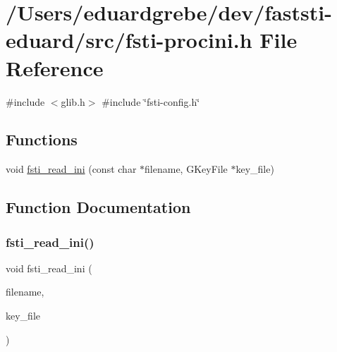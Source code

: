\hypertarget{fsti-procini_8h}{}\section{/\+Users/eduardgrebe/dev/faststi-\/eduard/src/fsti-\/procini.h File Reference}
\label{fsti-procini_8h}
{\ttfamily \#include $<$glib.\+h$>$}\newline
{\ttfamily \#include \char`\"{}fsti-\/config.\+h\char`\"{}}\newline
\subsection*{Functions}
\begin{DoxyCompactItemize}
\item 
void \mbox{\hyperlink{fsti-procini_8h_a438ad09d742e78ab09216d2b532f02bd}{fsti\+\_\+read\+\_\+ini}} (const char $\ast$filename, G\+Key\+File $\ast$key\+\_\+file)
\end{DoxyCompactItemize}


\subsection{Function Documentation}
\mbox{\label{fsti-procini_8h_a438ad09d742e78ab09216d2b532f02bd}} 
\subsubsection{\texorpdfstring{fsti\+\_\+read\+\_\+ini()}{fsti\_read\_ini()}}
{\footnotesize\ttfamily void fsti\+\_\+read\+\_\+ini (\begin{DoxyParamCaption}\item[{const char $\ast$}]{filename,  }\item[{G\+Key\+File $\ast$}]{key\+\_\+file }\end{DoxyParamCaption})}

